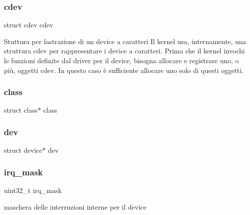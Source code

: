 \subsubsection{\texorpdfstring{cdev}{cdev}}
{\footnotesize\ttfamily struct cdev cdev}

Stuttura per l\textquotesingle{}astrazione di un device a caratteri Il kernel usa, internamente, una struttura cdev per rappresentare i device a caratteri. Prima che il kernel invochi le funzioni definite dal driver per il device, bisogna allocare e registrare uno, o più, oggetti cdev. In questo caso è sufficiente allocare uno solo di questi oggetti. \mbox{\label{structmy_g_p_i_o_k__t_a9b6474dd18270738a5c4853fd93b5e70}} 
\subsubsection{\texorpdfstring{class}{class}}
{\footnotesize\ttfamily struct class$\ast$ class}

\mbox{\label{structmy_g_p_i_o_k__t_acf6a82c73e7a9d99293d9ce0b8837faf}} 
\subsubsection{\texorpdfstring{dev}{dev}}
{\footnotesize\ttfamily struct device$\ast$ dev}

\mbox{\label{structmy_g_p_i_o_k__t_a8ee102d0534084ca58a9cf9b8a3d9cc9}} 
\subsubsection{\texorpdfstring{irq\+\_\+mask}{irq\_mask}}
{\footnotesize\ttfamily uint32\+\_\+t irq\+\_\+mask}

maschera delle interruzioni interne per il device \mbox{\label{structmy_g_p_i_o_k__t_a42a1593ebe61611c4e29413903a373a5}} 
